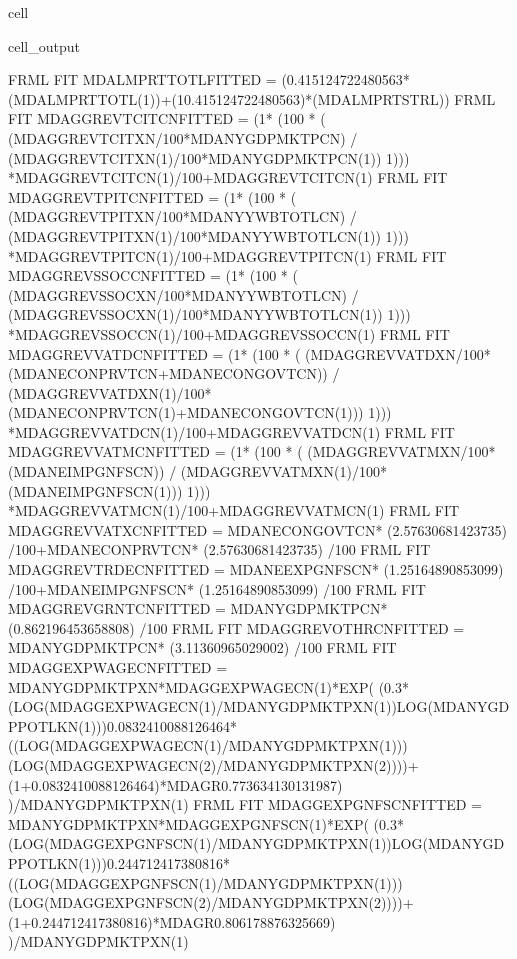 \documentclass[letterpaper,10pt,english]{jupyterBook}
\begin{document}
\begin{sphinxuseclass}{cell}
\begin{sphinxVerbatimOutput}
\begin{sphinxuseclass}{cell_output}
\begin{sphinxVerbatim}[commandchars=\\\{\}]
FRML \PYGZlt{}FIT\PYGZgt{} MDALMPRTTOTL\PYGZus{}\PYGZus{}FITTED =  (0.415124722480563*(MDALMPRTTOTL\PYGZus{}(\PYGZhy{}1))+(1\PYGZhy{}0.415124722480563)*(MDALMPRTSTRL\PYGZus{}))  \PYGZdl{}
FRML \PYGZlt{}FIT\PYGZgt{} MDAGGREVTCITCN\PYGZus{}FITTED =  (1* (100 * ( (MDAGGREVTCITXN/100*MDANYGDPMKTPCN) / (MDAGGREVTCITXN(\PYGZhy{}1)/100*MDANYGDPMKTPCN(\PYGZhy{}1)) \PYGZhy{}1))) *MDAGGREVTCITCN(\PYGZhy{}1)/100+MDAGGREVTCITCN(\PYGZhy{}1) \PYGZdl{}
FRML \PYGZlt{}FIT\PYGZgt{} MDAGGREVTPITCN\PYGZus{}FITTED =  (1* (100 * ( (MDAGGREVTPITXN/100*MDANYYWBTOTLCN) / (MDAGGREVTPITXN(\PYGZhy{}1)/100*MDANYYWBTOTLCN(\PYGZhy{}1)) \PYGZhy{}1))) *MDAGGREVTPITCN(\PYGZhy{}1)/100+MDAGGREVTPITCN(\PYGZhy{}1) \PYGZdl{}
FRML \PYGZlt{}FIT\PYGZgt{} MDAGGREVSSOCCN\PYGZus{}FITTED =  (1* (100 * ( (MDAGGREVSSOCXN/100*MDANYYWBTOTLCN) / (MDAGGREVSSOCXN(\PYGZhy{}1)/100*MDANYYWBTOTLCN(\PYGZhy{}1)) \PYGZhy{}1))) *MDAGGREVSSOCCN(\PYGZhy{}1)/100+MDAGGREVSSOCCN(\PYGZhy{}1) \PYGZdl{}
FRML \PYGZlt{}FIT\PYGZgt{} MDAGGREVVATDCN\PYGZus{}FITTED =  (1* (100 * ( (MDAGGREVVATDXN/100*(MDANECONPRVTCN+MDANECONGOVTCN)) / (MDAGGREVVATDXN(\PYGZhy{}1)/100*(MDANECONPRVTCN(\PYGZhy{}1)+MDANECONGOVTCN(\PYGZhy{}1))) \PYGZhy{}1))) *MDAGGREVVATDCN(\PYGZhy{}1)/100+MDAGGREVVATDCN(\PYGZhy{}1) \PYGZdl{}
FRML \PYGZlt{}FIT\PYGZgt{} MDAGGREVVATMCN\PYGZus{}FITTED =  (1* (100 * ( (MDAGGREVVATMXN/100*(MDANEIMPGNFSCN)) / (MDAGGREVVATMXN(\PYGZhy{}1)/100*(MDANEIMPGNFSCN(\PYGZhy{}1))) \PYGZhy{}1))) *MDAGGREVVATMCN(\PYGZhy{}1)/100+MDAGGREVVATMCN(\PYGZhy{}1) \PYGZdl{}
FRML \PYGZlt{}FIT\PYGZgt{} MDAGGREVVATXCN\PYGZus{}FITTED = MDANECONGOVTCN* (2.57630681423735) /100+MDANECONPRVTCN* (2.57630681423735) /100 \PYGZdl{}
FRML \PYGZlt{}FIT\PYGZgt{} MDAGGREVTRDECN\PYGZus{}FITTED = MDANEEXPGNFSCN* (1.25164890853099) /100+MDANEIMPGNFSCN* (1.25164890853099) /100 \PYGZdl{}
FRML \PYGZlt{}FIT\PYGZgt{} MDAGGREVGRNTCN\PYGZus{}FITTED = MDANYGDPMKTPCN* (0.862196453658808) /100 \PYGZdl{}
FRML \PYGZlt{}FIT\PYGZgt{} MDAGGREVOTHRCN\PYGZus{}FITTED = MDANYGDPMKTPCN* (3.11360965029002) /100 \PYGZdl{}
FRML \PYGZlt{}FIT\PYGZgt{} MDAGGEXPWAGECN\PYGZus{}FITTED = MDANYGDPMKTPXN*MDAGGEXPWAGECN(\PYGZhy{}1)*EXP( (\PYGZhy{}0.3*(LOG(MDAGGEXPWAGECN(\PYGZhy{}1)/MDANYGDPMKTPXN(\PYGZhy{}1))\PYGZhy{}LOG(MDANYGDPPOTLKN(\PYGZhy{}1)))\PYGZhy{}0.0832410088126464*((LOG(MDAGGEXPWAGECN(\PYGZhy{}1)/MDANYGDPMKTPXN(\PYGZhy{}1)))\PYGZhy{}(LOG(MDAGGEXPWAGECN(\PYGZhy{}2)/MDANYGDPMKTPXN(\PYGZhy{}2))))+(1+0.0832410088126464)*MDAGR\PYGZhy{}0.773634130131987) )/MDANYGDPMKTPXN(\PYGZhy{}1) \PYGZdl{}
FRML \PYGZlt{}FIT\PYGZgt{} MDAGGEXPGNFSCN\PYGZus{}FITTED = MDANYGDPMKTPXN*MDAGGEXPGNFSCN(\PYGZhy{}1)*EXP( (\PYGZhy{}0.3*(LOG(MDAGGEXPGNFSCN(\PYGZhy{}1)/MDANYGDPMKTPXN(\PYGZhy{}1))\PYGZhy{}LOG(MDANYGDPPOTLKN(\PYGZhy{}1)))\PYGZhy{}0.244712417380816*((LOG(MDAGGEXPGNFSCN(\PYGZhy{}1)/MDANYGDPMKTPXN(\PYGZhy{}1)))\PYGZhy{}(LOG(MDAGGEXPGNFSCN(\PYGZhy{}2)/MDANYGDPMKTPXN(\PYGZhy{}2))))+(1+0.244712417380816)*MDAGR\PYGZhy{}0.806178876325669) )/MDANYGDPMKTPXN(\PYGZhy{}1) \PYGZdl{}

\end{sphinxVerbatim}
\end{sphinxuseclass}
\end{sphinxVerbatimOutput}
\end{sphinxuseclass}
\end{document}
